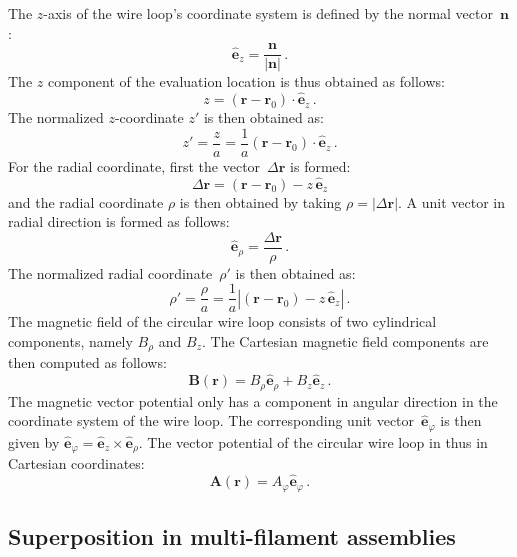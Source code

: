 The $z$-axis of the wire loop's coordinate system is defined by the normal vector~$\mathbf{n}$:
\begin{equation}
  \hat{\mathbf{e}}_z = \frac{\mathbf{n}}{|\mathbf{n}|} \, .
\end{equation}
The $z$ component of the evaluation location is thus obtained as follows:
\begin{equation}
  z = (\mathbf{r} - \mathbf{r}_0) \cdot \hat{\mathbf{e}}_z \, .
\end{equation}
The normalized $z$-coordinate $z'$ is then obtained as:
\begin{equation}
  z' = \frac{z}{a} = \frac{1}{a} (\mathbf{r} - \mathbf{r}_0) \cdot \hat{\mathbf{e}}_z \, .
\end{equation}
For the radial coordinate, first the vector~$\Delta \mathbf{r}$ is formed:
\begin{equation}
  \Delta \mathbf{r} = (\mathbf{r} - \mathbf{r}_0) - z \, \hat{\mathbf{e}}_z
\end{equation}
and the radial coordinate $\rho$ is then obtained by taking $\rho = |\Delta \mathbf{r}|$.
A unit vector in radial direction is formed as follows:
\begin{equation}
  \hat{\mathbf{e}}_\rho = \frac{\Delta \mathbf{r}}{\rho} \, .
\end{equation}
The normalized radial coordinate~$\rho'$ is then obtained as:
\begin{equation}
  \rho' = \frac{\rho}{a} = \frac{1}{a} |(\mathbf{r} - \mathbf{r}_0) - z \, \hat{\mathbf{e}}_z| \, .
\end{equation}
The magnetic field of the circular wire loop consists of two cylindrical components, namely $B_\rho$ and $B_z$.
The Cartesian magnetic field components are then computed as follows:
\begin{equation}
  \mathbf{B}(\mathbf{r}) = B_\rho \hat{\mathbf{e}}_\rho + B_z \hat{\mathbf{e}}_z \, .
\end{equation}
The magnetic vector potential only has a component in angular direction in the coordinate system of the wire loop.
The corresponding unit vector~$\hat{\mathbf{e}}_\varphi$ is then given by
$\hat{\mathbf{e}}_\varphi = \hat{\mathbf{e}}_z \times \hat{\mathbf{e}}_\rho$.
The vector potential of the circular wire loop in thus in Cartesian coordinates:
\begin{equation}
  \mathbf{A}(\mathbf{r}) = A_\varphi \hat{\mathbf{e}}_\varphi \, .
\end{equation}

\subsection{Superposition in multi-filament assemblies}

